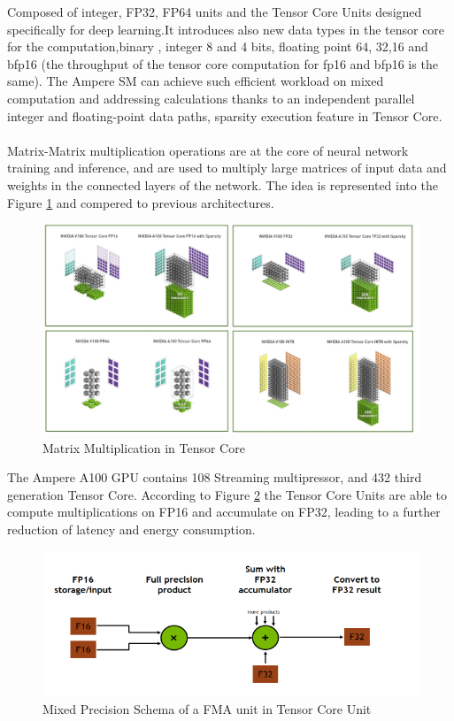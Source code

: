 Composed of integer, FP32, FP64 units and the Tensor Core Units designed specifically for deep learning.It introduces also new data types in the tensor core for the computation,binary , integer 8 and 4 bits, floating point 64, 32,16 and bfp16 (the throughput of the tensor core computation for fp16 and bfp16 is the same). The Ampere SM can achieve such efficient workload on mixed computation and addressing calculations thanks to an independent parallel integer and floating-point data paths, sparsity execution feature in Tensor Core. \\\\

Matrix-Matrix multiplication operations are at the core of neural network training and inference, and are used to multiply large matrices of input data and weights in the connected layers of the network. The idea is represented into the Figure \ref{fig:tensorcorevolta} and compered to previous architectures.

\begin{figure}[!htbp]
\centering
\captionsetup{justification=centering}
\includegraphics[scale=0.6]{./figure/tensor_core.PNG}
\caption{Matrix Multiplication in Tensor Core\cite{paper:41}}
\label{fig:tensorcorevolta}
\end{figure}

The Ampere A100 GPU contains 108 Streaming multipressor, and 432 third generation Tensor Core.
According to Figure \ref{fig:mixprec} the Tensor Core Units are able to compute multiplications on FP16 and accumulate on FP32, leading to a further reduction of latency and energy consumption.
\begin{figure}[!htbp]
\centering
\captionsetup{justification=centering}
\includegraphics[scale=0.8]{./figure/mix_prec.PNG}
\caption{Mixed Precision Schema of a FMA unit in Tensor Core Unit\cite{paper:41}}
\label{fig:mixprec}
\end{figure}

